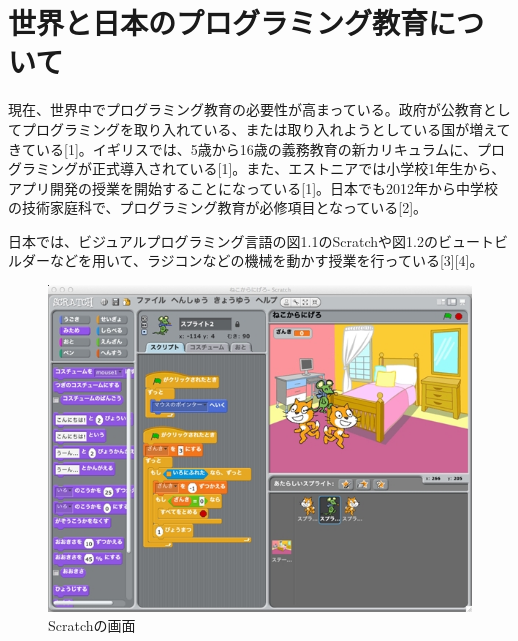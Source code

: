 \documentclass[openany,11pt,papersize]{jsbook}
\begin{document}
\section{世界と日本のプログラミング教育について}
現在、世界中でプログラミング教育の必要性が高まっている。政府が公教育としてプログラミングを取り入れている、または取り入れようとしている国が増えてきている[1]。イギリスでは、5歳から16歳の義務教育の新カリキュラムに、プログラミングが正式導入されている[1]。また、エストニアでは小学校1年生から、アプリ開発の授業を開始することになっている[1]。日本でも2012年から中学校の技術家庭科で、プログラミング教育が必修項目となっている[2]。

日本では、ビジュアルプログラミング言語の図1.1のScratchや図1.2のビュートビルダーなどを用いて、ラジコンなどの機械を動かす授業を行っている[3][4]。
\begin{figure}[H]
\begin{center}
\includegraphics[width=15cm, bb=0 0 1206 950]{img/scratch.jpg}
\end{center}
\caption{Scratchの画面}
\end{figure}
\end{document}

